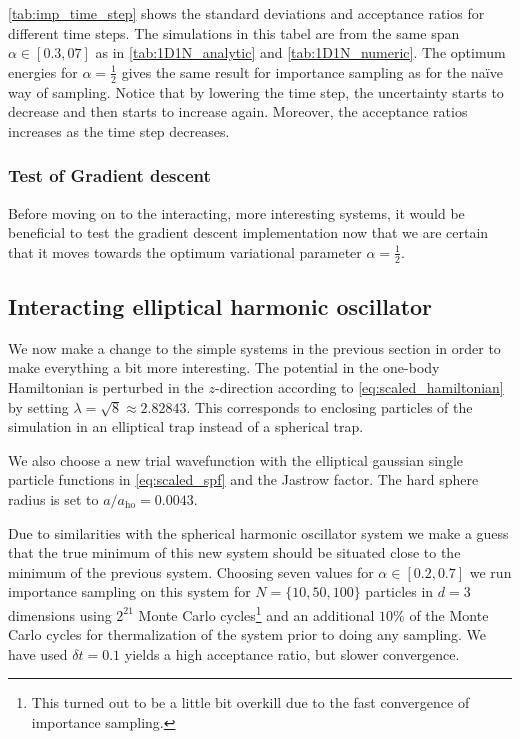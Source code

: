 \documentclass[
    a4paper, aps, twocolumn, floatfix, superscriptaddress, nofootinbib]{revtex4-1}
\newcommand{\1}{\mathds{1}}
\begin{document}
            \autoref{tab:imp_time_step} shows the standard deviations and
            acceptance ratios for different time steps. The simulations in this
            tabel are from the same span $\alpha \in [0.3, 07]$ as in
            \autoref{tab:1D1N_analytic} and \autoref{tab:1D1N_numeric}. The
            optimum energies for $\alpha = \frac{1}{2}$ gives the same result
            for importance sampling as for the naïve way of sampling. Notice
            that by lowering the time step, the uncertainty starts to decrease
            and then starts to increase again. Moreover, the acceptance ratios
            increases as the time step decreases.

        \subsubsection{Test of Gradient descent}

            Before moving on to the interacting, more interesting systems, it
            would be beneficial to test the gradient descent implementation now
            that we are certain that it moves towards the optimum variational
            parameter $\alpha = \frac{1}{2}$.

    \subsection{Interacting elliptical harmonic oscillator}
        We now make a change to the simple systems in the previous section in
        order to make everything a bit more interesting. The potential in the
        one-body Hamiltonian is perturbed in the $z$-direction according to
        \autoref{eq:scaled_hamiltonian} by setting $\lambda = \sqrt{8} \approx
        2.82843$. This corresponds to enclosing particles of the simulation in
        an elliptical trap instead of a spherical trap.

        We also choose a new trial wavefunction with the elliptical gaussian
        single particle functions in \autoref{eq:scaled_spf} and the Jastrow
        factor. The hard sphere radius is set to $a/a_{\text{ho}} = 0.0043$.

        Due to similarities with the spherical harmonic oscillator
        system we make a guess that the true minimum of this new system should
        be situated close to the minimum of the previous system. Choosing seven
        values for $\alpha \in [0.2, 0.7]$ we run importance sampling on this
        system for $N = \{10, 50, 100\}$ particles in $d = 3$ dimensions using
        $2^{21}$ Monte Carlo cycles\footnote{This turned out to be a little bit
        overkill due to the fast convergence of importance sampling.} and an
        additional $10\%$ of the Monte Carlo cycles for thermalization of the
        system prior to doing any sampling. We have used $\delta t = 0.1$ yields
        a high acceptance ratio, but slower convergence.
\end{document}
